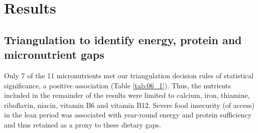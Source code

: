 

\section{Results}

\subsection{Triangulation to identify energy, protein and micronutrient gaps}

Only 7 of the 11 micronutrients met our triangulation decision rules of statistical significance, a positive association (Table \ref{tab:06_1}). Thus, the nutrients included in the remainder of the results were limited to calcium, iron, thiamine, riboflavin, niacin, vitamin B6 and vitamin B12. Severe food insecurity (of access) in the lean period was associated with year-round energy and protein sufficiency and thus retained as a proxy to these dietary gaps.


